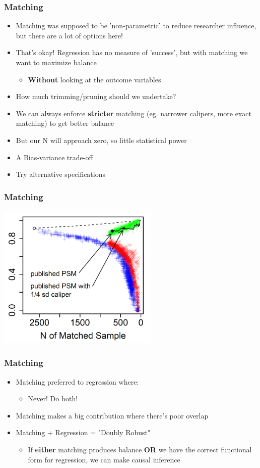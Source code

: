 \documentclass[xcolor=x11names,compress]{beamer}\usepackage[]{graphicx}\usepackage[]{color}
\renewcommand{\(}{\begin{columns}}
\renewcommand{\)}{\end{columns}}
\newcommand{\<}[1]{\begin{column}{#1}}
\renewcommand{\>}{\end{column}}
\begin{document}
\begin{frame}
\frametitle{Matching}
\begin{itemize}
\item Matching was supposed to be 'non-parametric' to reduce researcher influence, but there are a lot of options here!
\pause
\item That's okay! Regression has no measure of 'success', but with matching we want to maximize balance
\pause
\begin{itemize}
\item \textbf{Without} looking at the outcome variables
\end{itemize}
\pause
\item How much trimming/pruning should we undertake?
\pause
\item We can always enforce \textbf{stricter} matching (eg. narrower calipers, more exact matching) to get better balance
\pause
\item But our N will approach zero, so little statistical power
\pause
\item A Bias-variance trade-off
\pause
\item Try alternative specifications
\end{itemize}
\end{frame}

\begin{frame}
\frametitle{Matching}
\includegraphics[width=0.58\textwidth]{Balance-N_trade-off.png}
\end{frame}

\begin{frame}
\frametitle{Matching}
\begin{itemize}
\item Matching preferred to regression where:
\pause
\begin{itemize}
\item Never! Do both!
\end{itemize}
\item Matching makes a big contribution where there's poor overlap
\pause
\item Matching + Regression = "Doubly Robust"
\pause
\begin{itemize}
\item If \textbf{either} matching produces balance \textbf{OR} we have the correct functional form for regression, we can make causal inference
\end{itemize}
\end{itemize}
\end{frame}
\end{document}
